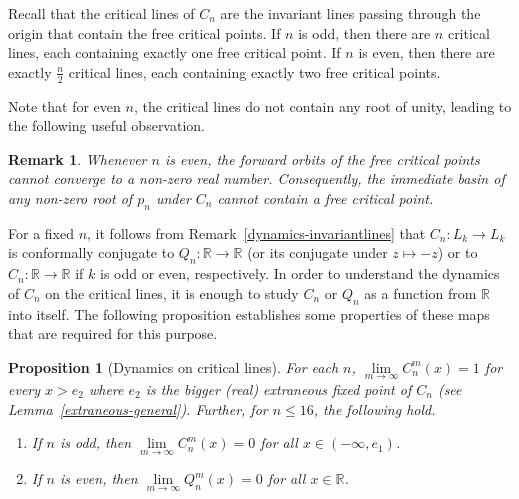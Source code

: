 \documentclass[12pt]{article}
\newtheorem{prop}{Proposition}[section]
\newtheorem{rem}{Remark}[section]
\begin{document}
	Recall that the critical lines of $C_n$ are the invariant lines passing through the origin that contain the free critical points. If $n$ is odd, then there are $n$ critical lines, each containing exactly one free critical point. If $n$ is even, then there are exactly $\frac{n}{2}$ critical lines, each containing exactly two free critical points.
	
	Note that for even $n$, the critical lines do not contain any root of unity, leading to the following useful observation.
	
	\begin{rem}\label{No_free_cr_for_even}
		Whenever $n$ is even, the forward orbits of the free critical points cannot converge to a non-zero real number. Consequently, the immediate basin of any non-zero root of $p_n$ under $C_n$  cannot contain a free critical point.
	\end{rem}
	 For a fixed $n$, it follows from Remark~\ref{dynamics-invariantlines} that $C_n :L_k \to L_k$ is conformally conjugate to  $Q_n : \mathbb{R} \to \mathbb{R}$ (or its conjugate under $z \mapsto -z$) or to $C_n: \mathbb{R} \to \mathbb{R}$  if $k$ is odd or even, respectively. In order to understand the dynamics of $C_n$ on the critical lines, it is enough to study $C_n$ or $Q_n$ as a function from $\mathbb{R} $ into itself. The following proposition establishes some properties of these maps that are required for this purpose.
\begin{prop}[Dynamics on critical lines]
For each $n$, $\lim\limits_{m \to \infty} C_n ^m (x)=1$ for every $x>e_2$ where $e_2$ is the bigger (real) extraneous fixed point of $C_n$ (see Lemma~\ref{extraneous-general}). 
 Further, for $n \leq 16$, the following hold.
\begin{enumerate}
	
	\item If $n$ is odd, then $\lim\limits_{m \to \infty} C_n ^m (x)= 0$ for all $x \in (-\infty, e_1)$.
	\item If $n$ is even, then $ \lim\limits_{m \to \infty} Q_n ^m (x)= 0$ for all 
	$x \in \mathbb{R}$.
\end{enumerate}
\label{dynamics-criticallines}
\end{prop}
\end{document}
